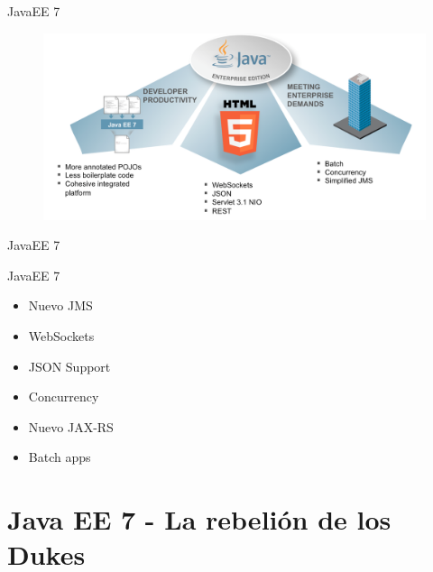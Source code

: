 \documentclass{beamer}
\begin{document}
\begin{frame}{JavaEE 7}
\begin{figure}
\centering
\includegraphics[width=0.75\linewidth]{Images/javaee7-theme}
\end{figure}
\end{frame}

\begin{frame}{JavaEE 7}
\begin{exampleblock}{JavaEE 7}
\begin{itemize}
\item Nuevo JMS
\item WebSockets
\item JSON Support
\item Concurrency
\item Nuevo JAX-RS
\item Batch apps
\end{itemize}
\end{exampleblock}
\end{frame}



\section{Java EE 7 - La rebelión de los Dukes}
\end{document}
